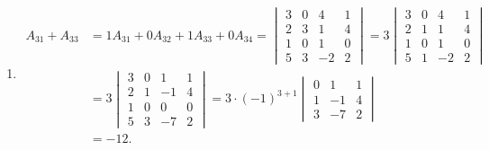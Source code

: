 \documentclass[12pt,fontset=fandol]{ctexart}
\begin{document}
\begin{solve}
\begin{enumerate}
                \item \begin{align*}
                            A_{31}+A_{33}
                            & = 1A_{31}+0A_{32}+1A_{33}+0A_{34}
                            = \begin{vmatrix}
                                3 & 0 & 4  & 1 \\
                                2 & 3 & 1  & 4 \\
                                1 & 0 & 1  & 0 \\
                                5 & 3 & -2 & 2
                            \end{vmatrix}
                            = 3 \begin{vmatrix}
                                    3 & 0 & 4  & 1 \\
                                    2 & 1 & 1  & 4 \\
                                    1 & 0 & 1  & 0 \\
                                    5 & 1 & -2 & 2
                                \end{vmatrix}                   \\
                            & = 3 \begin{vmatrix}
                                    3 & 0 & 1  & 1 \\
                                    2 & 1 & -1 & 4 \\
                                    1 & 0 & 0  & 0 \\
                                    5 & 3 & -7 & 2
                                \end{vmatrix}
                            = 3 \cdot (-1)^{3+1} \begin{vmatrix}
                                                    0 & 1  & 1 \\
                                                    1 & -1 & 4 \\
                                                    3 & -7 & 2
                                                \end{vmatrix}  \\
                            & = -12.
                        \end{align*}


\end{enumerate}
\end{solve}
\end{document}
